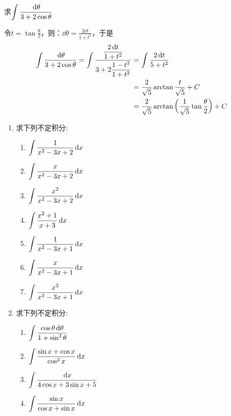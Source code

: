\begin{example}
    求$\displaystyle\int \dfrac{\,{\rm d}\theta}{3+2\cos\theta}$
\end{example}

\begin{solution}
    令$t=\tan\frac{\theta}{2}$，则：$\dd\theta=\frac{2\dd t}{1+t^2}$，于是
\[\begin{split}
    \displaystyle\int \dfrac{\,{\rm d}\theta}{3+2\cos\theta}=\int\dfrac{\dfrac{2\,{\rm d} t}{1+t^2}}{3+2\dfrac{1-t^2}{1+t^2}}&=\int \dfrac{2\,{\rm d} t}{5+t^2}\\
    &=\dfrac{2}{\sqrt{5}} \arctan\dfrac{t}{\sqrt{5}}+C\\
    &=\dfrac{2}{\sqrt{5}}\arctan\left(\dfrac{1}{\sqrt{5}}\tan\dfrac{\theta}{2}\right)+C
\end{split}\]
\end{solution}

\begin{ex}
\begin{enumerate}
\item 求下列不定积分:
\begin{multicols}{2}
\begin{enumerate}
\item  $\displaystyle\int \dfrac{1}{x^{2}-3 x+2}\,{\rm d} x$
\item  $\displaystyle\int  \dfrac{x}{x^{2}-3 x+2}\,{\rm d} x$
\item  $\displaystyle\int  \dfrac{x^{2}}{x^{2}-3 x+2}\,{\rm d} x$
\item  $\displaystyle\int \dfrac{x^{2}+1}{x+3}\,{\rm d} x$
\item  $\displaystyle\int \dfrac{1}{x^{2}-3 x+1}\,{\rm d} x$
\item  $\displaystyle\int \dfrac{x}{x^{2}-3 x+1}\,{\rm d} x$
\item  $\displaystyle\int \dfrac{x^{2}}{x^{2}-3 x+1}\,{\rm d} x$
\end{enumerate}
\end{multicols}

\item 求下列不定积分:
\begin{multicols}{2}
    \begin{enumerate}
        \item  $\displaystyle\int  \dfrac{\cos \theta \,{\rm d} \theta}{1+\sin ^{2} \theta}$
        \item  $\displaystyle\int \dfrac{\sin x+\cos x}{\cos ^{2} x}\,{\rm d} x$
        \item  $\displaystyle\int  \dfrac{\,{\rm d} x}{4 \cos x+3 \sin x+5}$
        \item  $\displaystyle\int \dfrac{\sin x}{\cos x+\sin x}\,{\rm d} x$
    \end{enumerate}
\end{multicols}
\end{enumerate}
\end{ex}

